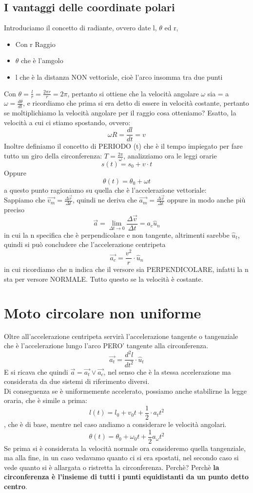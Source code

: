\documentclass[12pt, a4paper, openany, oneside]{book}
\begin{document}
\subsection{I vantaggi delle coordinate polari}
Introduciamo il concetto di radiante, ovvero date l, $\theta$ ed r,
\begin{itemize}
	\item Con r Raggio
	\item $\theta$ che è l'amgolo
	\item l che è la distanza NON vettoriale, cioè l'arco insomma tra due punti
\end{itemize}
Con $\theta = \frac{l}{r} = \frac{2 \pi r}{r} = 2 \pi$, pertanto si ottiene che
la velocità angolare $\omega$ sia = a $\omega = \frac{d \theta}{dt}$, e ricordiamo
che prima si era detto di essere in velocità costante, pertanto se moltiplichiamo
la velocità angolare per il raggio cosa otteniamo? Esatto, la velocità a cui
ci stiamo spostando, ovvero:
\[\omega R = \frac{dl}{dt} = v\]
Inoltre definiamo il concetto di PERIODO (t) che è il tempo impiegato per fare
tutto un giro della circonferenza: $T = \frac{2 \pi}{\omega}$, analizziamo
ora le leggi orarie
\[s(t) = s_{0} + v\cdot t\] Oppure
\[\theta(t) = \theta _{0} + \omega t\] a questo punto ragioniamo su quella
che è l'accelerazione vettoriale:\\ 
Sappiamo che $\overrightarrow{v_{m}} = \frac{\Delta \overrightarrow{r}}{\Delta t}$,
quindi ne deriva che $\overrightarrow{a_{m}} =
\frac{\Delta \overrightarrow{v}}{\Delta t}$ oppure in modo anche più preciso
\[\overrightarrow{a} = \lim \limits_{\Delta t \to 0} 
\frac{\Delta \overrightarrow{v}}{\Delta t} = a_{c} \widehat{u}_{n}\] in cui la
n specifica che è perpendicolare e non tangente, altrimenti sarebbe $\widehat{u}_{t}$, 
quindi si può concludere che l'accelerazione centripeta \[\overrightarrow{a_{c}}
= \frac{v^{2}}{r} \cdot \widehat{u}_{n}\] in cui ricordiamo che n indica che il 
versore sia PERPENDICOLARE, infatti la n sta per versore NORMALE.
Tutto questo se la velocità è costante.
\section{Moto circolare non uniforme}
Oltre all'accelerazione centripeta servirà l'accelerazione tangente o tangenziale
che è l'accelerazione lungo l'arco PERO' tangente alla circonferenza.
\[\overrightarrow{a_{t}} = \frac{d^{2}l}{dt^{2}}\cdot \widehat{u}_{t}\] E
si ricava che quindi $\overrightarrow{a} = \overrightarrow{a_{t}} \vee 
\overrightarrow{a_{c}}$, nel senso che è la stessa accelerazione ma considerata
da due sistemi di riferimento diversi. \\
Di conseguenza se è uniformemente accelerato, possiamo
anche stabilirne la legge oraria, che è simile a prima: 
\[l(t) = l_{0} + v_{0}t + \frac{1}{2} \cdot a_{t}t^{2}\], che è di base, mentre
nel caso andiamo a considerare le velocità angolari.
\[\theta(t) = \theta _{0} + \omega _{0}t + \frac{1}{2} a_{\omega}t^{2}\]
Se prima si è considerata la velocità normale ora consideremo quella tangenziale, 
ma alla fine, in un caso vedavamo quanto ci si era spostati, nel secondo caso
si vede quanto si è allargata o ristretta la circonferenza. Perchè? 
Perchè \textbf{la circonferenza è l'insieme di tutti i punti equidistanti da un punto
detto centro}.
\end{document}
